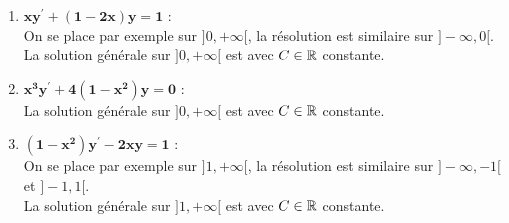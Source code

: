 \documentclass[a4paper, 11pt,reqno]{article}
\begin{document}
\begin{correction}
\begin{enumerate}
\begin{itemize}
\begin{itemize}
\noindent $3bx^2+2cx+d=x^2$. Par identification des coefficients d'un polyn\^{o}me, on obtient ainsi que: $y_1: x\in\R\mapsto \ddp\frac{x^3}{3}e^x$.
\item[$\star$] Recherche d'une solution particuli\`{e}re de l'\'equation avec second membre: $y^{\prime}-y=x^2e^{-x}$:\\
\noindent Comme la fonction $a$ est constante et que le second membre est de type polyn\^{o}me et exponentielle, on peut chercher cette solution sous la forme: $y_2: x\mapsto (bx^2+cx+d)e^{-x}$ avec $(b,c,d)\in\R^3$. On obtient ainsi pour tout $x\in\R$ en divisant par $e^{-x}\not= 0$ que:\\ 
\noindent $-2bx^2+(2b-2c)x+(c-2d)=x^2$. Par identification des coefficients d'un polyn\^{o}me, on obtient ainsi que: $y_2: x\in\R\mapsto -\left( \ddp\frac{x^2}{2}+ \ddp\frac{x}{2}+ \ddp\frac{1}{4} \right)e^x$.
\item[$\star$] D'apr\`{e}s le principe de superposition, on obtient donc que une solution particuli\`{e}re est: $y_p=y_1+y_2$.
\end{itemize}
\item[$\bullet$] Conclusion: la solution g\'en\'erale de l'\'equation diff\'erentielle avec second membre est alors:\\
\noindent {} avec $C\in\R$ constante.
\end{itemize}
\item \textbf{$\mathbf{xy^{\prime}+(1-2x)y=1}$} :\\
On se place par exemple sur $]0,+\infty[$, la r\'esolution est similaire sur $]-\infty,0[$.\\
La solution g\'en\'erale sur $]0,+\infty[$ est   avec $C\in\R$ constante.
\item \textbf{$\mathbf{x^3y^{\prime}+4(1-x^2)y=0}$} :\\
La solution g\'en\'erale  sur $]0,+\infty[$ est    avec $C \in\R$ constante.\\
\item \textbf{$\mathbf{(1-x^2)y^{\prime}-2xy=1}$} :\\
On se place par exemple sur $]1,+\infty[$, la r\'esolution est similaire sur  $]-\infty, -1[$ et $]-1,1[$.\\
La solution g\'en\'erale  sur $]1,+\infty[$ est    avec $C \in\R$ constante.\\

\end{enumerate}
\end{correction}
\end{document}
